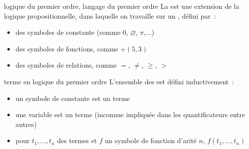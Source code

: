 \begin{adjustwidth}{-3cm}{-3cm}
\begin{definition}{7.20}{logique du premier ordre, langage du premier ordre}
    La  est une extension de la logique propositionnelle, dans laquelle on travaille sur un , défini par~:
    \begin{itemize}
        \item des symboles de constante (comme $0$, $\varnothing$, $\pi$,...)
        \item des symboles de fonctions, comme $+ (5,3)$
        \item des symboles de relations, comme $=$, $\neq$, $\geq$, $>$
    \end{itemize}
\end{definition}

\begin{definition}{7.21}{terme en logique du premier ordre}
    L'ensemble des  est défini inductivement~:
    \begin{itemize}
        \item un symbole de constante est un terme
        \item une variable est un terme (inconnue impliquée dans les quantificateurs entre autres)
        \item pour $t_1, \dots, t_n$ des termes et $f$ un symbole de fonction d'arité $n$, $f(t_1, \dots, t_n)$
    \end{itemize}
\end{definition}


\end{adjustwidth}

